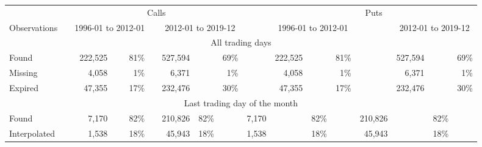 

		\begin{tabular}{*{2}{l} *{15}{r} }
		       
		        
		         \multicolumn{2}{c}{}  & \multicolumn{7}{c}{Calls}  &  \multicolumn{1}{c}{} & 
		         \multicolumn{7}{c}{Puts} \\
		         
		          
		         \cline{3-9}
		         \cline{11-17}
		       
		         
		          \multicolumn{1}{l}{Observations} &  \multicolumn{1}{l}{} &
		          \multicolumn{3}{c}{1996-01 to 2012-01} & 
		          \multicolumn{1}{c}{} &
			\multicolumn{3}{c}{2012-01 to 2019-12} & 
			\multicolumn{1}{c}{} &
		          \multicolumn{3}{c}{1996-01 to 2012-01} & 
		          \multicolumn{1}{c}{} &
			\multicolumn{3}{c}{2012-01 to 2019-12} \\
		        

		       \hline
		       
		       \multicolumn{17}{c}{All trading days} \\ 
		       
		       \hline 

	
		Found &   & 
		222,525 &  & 81\% & 
		 & 
		 527,594 &  &69\% & 
		 & 
		 222,525 &  & 81\% & 
		 & 
		 527,594& &69\% 
		 \\

		
		Missing &   & 
		4,058 &  & 1\% & 
		 & 
		 6,371 &  &1\% & 
		 & 
		 4,058 &  & 1\% & 
		 & 
		 6,371& &1\% 
		 \\

		
		Expired &   & 
		47,355 &  & 17\% & 
		 & 
		 232,476 &  &30\% & 
		 & 
		 47,355 &  & 17\% & 
		 & 
		 232,476& &30\% 
		 \\

		
        \hline
        
         \multicolumn{17}{c}{Last trading day of the month} \\

	
		Found &   & 
		7,170 &  & 82\% & 
		 & 
		 210,826 & 82\% & 
		 & 
		 7,170 &  & 82\% & 
		 & 
		 210,826& &82\% 
		 \\

		
		Interpolated &   & 
		1,538 &  & 18\% & 
		 & 
		 45,943 & 18\% & 
		 & 
		 1,538 &  & 18\% & 
		 & 
		 45,943& &18\% 
		 \\

		

	        \hline
	    \end{tabular}
	
